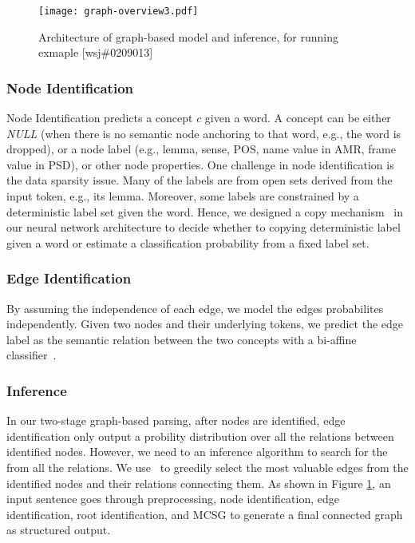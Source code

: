 \begin{figure}[h] \centering
  \texttt{[image: graph-overview3.pdf]}
\caption{\label{fig:graph-based-inference} Architecture of graph-based model and inference, for running exmaple [wsj\#0209013]}
\end{figure}

\subsubsection{Node Identification}
\label{sssec:lex-phr:node-ident}
Node Identification predicts a concept $c$ given a word. A
concept can be either {\it NULL} (when there is no semantic node
anchoring to that word, e.g., the word is dropped), or a node label
(e.g., lemma, sense, POS, name value in AMR, frame value in PSD), or
other node properties. One challenge in node identification is the
data sparsity issue. Many of the labels are from open sets derived
from the input token, e.g., its lemma.  Moreover, some labels are
constrained by a deterministic label set given the word. Hence, we
designed a copy mechanism~\citep{luong2014addressing} in our neural
network architecture to decide whether to copying deterministic label
given a word or estimate a classification probability from a fixed
label set.


\subsubsection{Edge Identification}
\label{sssec:lex-phr:edge-ident}

By assuming the independence of each edge, we model the edges
probabilites independently.  Given two nodes and their underlying
tokens, we predict the edge label as the semantic relation between the
two concepts with a bi-affine classifier~\cite{dozat2016deep}.

\subsubsection{Inference}
\label{sssec:lex-phr:inference}
In our two-stage graph-based parsing, after nodes are identified, edge
identification only output a probility distribution over all the
relations between identified nodes. However, we need to an inference
algorithm to search for the  from all
the relations. We use~\citet[MSCG,][]{Flanigan:2014vc} to greedily
select the most valuable edges from the identified nodes and their
relations connecting them. As shown in Figure
\ref{fig:graph-based-inference}, an input sentence goes through
preprocessing, node identification, edge identification, root
identification, and MCSG to generate a final connected graph as
structured output.

